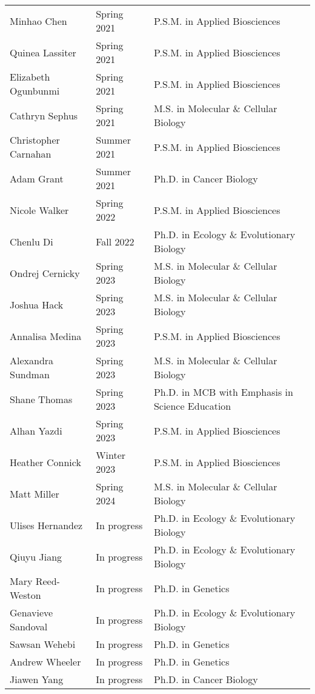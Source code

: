 \documentclass[11pt]{article}
\begin{document}
\begin{longtable}[l]{l l l}
Minhao Chen & Spring 2021 & P.S.M. in Applied Biosciences\\
Quinea Lassiter & Spring 2021 & P.S.M. in Applied Biosciences\\
Elizabeth Ogunbunmi & Spring 2021 & P.S.M. in Applied Biosciences\\
Cathryn Sephus & Spring 2021 & M.S. in Molecular \& Cellular Biology\\
Christopher Carnahan & Summer 2021 & P.S.M. in Applied Biosciences\\
Adam Grant & Summer 2021 & Ph.D. in Cancer Biology\\
Nicole Walker & Spring 2022 & P.S.M. in Applied Biosciences\\
Chenlu Di & Fall 2022 & Ph.D. in Ecology \& Evolutionary Biology\\
Ondrej Cernicky & Spring 2023 & M.S. in Molecular \& Cellular Biology\\
Joshua Hack & Spring 2023 & M.S. in Molecular \& Cellular Biology\\
Annalisa Medina & Spring 2023 & P.S.M. in Applied Biosciences\\ %
Alexandra Sundman & Spring 2023 & M.S. in Molecular \& Cellular Biology\\ %
Shane Thomas & Spring 2023 & Ph.D. in MCB with Emphasis in Science Education\\ %
Alhan Yazdi & Spring 2023 & P.S.M. in Applied Biosciences\\
Heather Connick & Winter 2023 & P.S.M. in Applied Biosciences\\
Matt Miller & Spring 2024 & M.S. in Molecular \& Cellular Biology\\ %
Ulises Hernandez & In progress & Ph.D. in Ecology \& Evolutionary Biology\\
Qiuyu Jiang & In progress & Ph.D. in Ecology \& Evolutionary Biology\\
Mary Reed-Weston & In progress & Ph.D. in Genetics\\
Genavieve Sandoval & In progress & Ph.D. in Ecology \& Evolutionary Biology\\
Sawsan Wehebi & In progress & Ph.D. in Genetics\\
Andrew Wheeler & In progress & Ph.D. in Genetics\\
Jiawen Yang & In progress & Ph.D. in Cancer Biology\\
\end{longtable}
\end{document}
